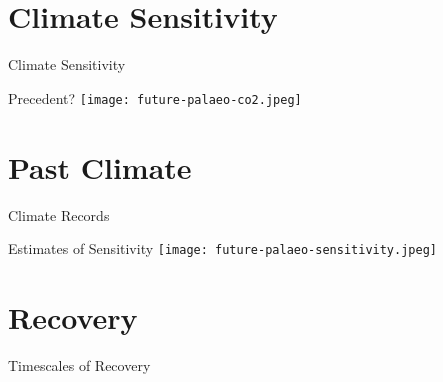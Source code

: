 \section{Climate Sensitivity}

\begin{frame}{Climate Sensitivity}

\end{frame}

\begin{frame}{Precedent?}
    \texttt{[image: future-palaeo-co2.jpeg]}
\end{frame}            

\section{Past Climate}

\begin{frame}{Climate Records}
\end{frame}

\begin{frame}{Estimates of Sensitivity}
    \texttt{[image: future-palaeo-sensitivity.jpeg]}
\end{frame}

\section{Recovery}

\begin{frame}{Timescales of Recovery}
\end{frame}








